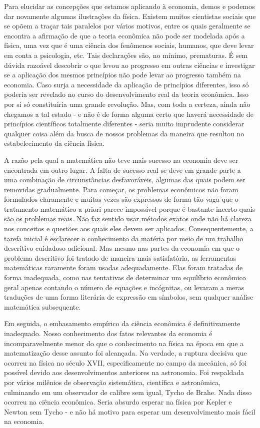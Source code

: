 \documentclass[a4paper,12pt]{article}[abntex2]
\begin{document}
Para elucidar as concepções que estamos aplicando à economia, demos e podemos dar novamente algumas ilustrações da física. Existem muitos cientistas sociais que se opõem a traçar tais paralelos por vários motivos, entre os quais geralmente se encontra a afirmação de que a teoria econômica não pode ser modelada após a física, uma vez que é uma ciência dos fenômenos sociais, humanos, que deve levar em conta a psicologia, etc. Tais declarações são, no mínimo, prematuras. É sem dúvida razoável descobrir o que levou ao progresso em outras ciências e investigar se a aplicação dos mesmos princípios não pode levar ao progresso também na economia. Caso surja a necessidade da aplicação de princípios diferentes, isso só poderia ser revelado no curso do desenvolvimento real da teoria econômica. Isso por si só constituiria uma grande revolução. Mas, com toda a certeza, ainda não chegamos a tal estado - e não é de forma alguma certo que haverá necessidade de princípios científicos totalmente diferentes - seria muito imprudente considerar qualquer coisa além da busca de nossos problemas da maneira que resultou no estabelecimento da ciência física.

A razão pela qual a matemática não teve mais sucesso na economia deve ser encontrada em outro lugar. A falta de sucesso real se deve em grande parte a uma combinação de circunstâncias desfavoráveis, algumas das quais podem ser removidas gradualmente. Para começar, os problemas econômicos não foram formulados claramente e muitas vezes são expressos de forma tão vaga que o tratamento matemático a priori parece impossível porque é bastante incerto quais são os problemas reais. Não faz sentido usar métodos exatos onde não há clareza nos conceitos e questões aos quais eles devem ser aplicados. Consequentemente, a tarefa inicial é esclarecer o conhecimento da matéria por meio de um trabalho descritivo cuidadoso adicional. Mas mesmo nas partes da economia em que o problema descritivo foi tratado de maneira mais satisfatória, as ferramentas matemáticas raramente foram usadas adequadamente. Elas foram tratadas de forma inadequada, como nas tentativas de determinar um equilíbrio econômico geral apenas contando o número de equações e incógnitas, ou levaram a meras traduções de uma forma literária de expressão em símbolos, sem qualquer análise matemática subsequente.

Em seguida, o embasamento empírico da ciência econômica é definitivamente inadequado. Nosso conhecimento dos fatos relevantes da economia é incomparavelmente menor do que o conhecimento na física na época em que a matematização desse assunto foi alcançada. Na verdade, a ruptura decisiva que ocorreu na física no século XVII, especificamente no campo da mecânica, só foi possível devido aos desenvolvimentos anteriores na astronomia. Foi respaldada por vários milênios de observação sistemática, científica e astronômica, culminando em um observador de calibre sem igual, Tycho de Brahe. Nada disso ocorreu na ciência econômica. Seria absurdo esperar na física por Kepler e Newton sem Tycho - e não há motivo para esperar um desenvolvimento mais fácil na economia.
\end{document}
